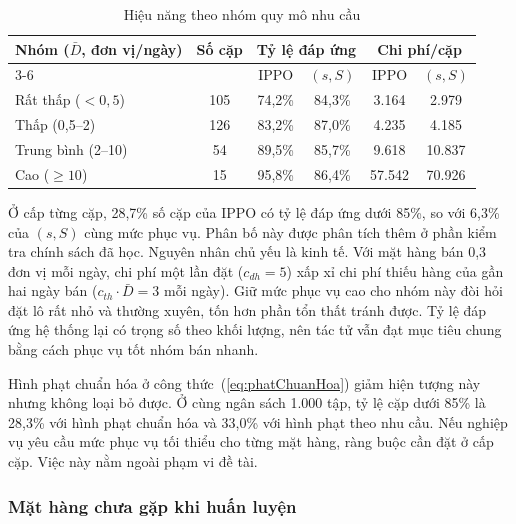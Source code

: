 \begin{table}[H]
    \centering
    \caption{Hiệu năng theo nhóm quy mô nhu cầu}
    \label{tab:theoQuyMo}
    \small
    \begin{tabular}{|l|c|c|c|c|c|}
        \hline
        \multirow{2}{*}{Nhóm ($\bar{D}$, đơn vị/ngày)} &
        \multirow{2}{*}{Số cặp} &
        \multicolumn{2}{c|}{Tỷ lệ đáp ứng} &
        \multicolumn{2}{c|}{Chi phí/cặp} \\
        \cline{3-6}
        & & IPPO & $(s,S)$ & IPPO & $(s,S)$ \\
        \hline
        Rất thấp ($< 0{,}5$)     & 105 & 74,2\% & 84,3\% & 3.164 & 2.979 \\ \hline
        Thấp (0,5--2)      & 126 & 83,2\% & 87,0\% & 4.235 & 4.185 \\ \hline
        Trung bình (2--10)   & 54  & 89,5\% & 85,7\% & 9.618 & 10.837 \\ \hline
        Cao ($\ge 10$)           & 15  & 95,8\% & 86,4\% & 57.542 & 70.926 \\
        \hline
    \end{tabular}
\end{table}

Ở cấp từng cặp, 28,7\% số cặp của IPPO có tỷ lệ đáp ứng dưới 85\%, so với 6,3\% của $(s, S)$ cùng mức phục vụ. Phân bố này được phân tích thêm ở phần kiểm tra chính sách đã học. Nguyên nhân chủ yếu là kinh tế. Với mặt hàng bán 0,3 đơn vị mỗi ngày, chi phí một lần đặt ($c_{dh} = 5$) xấp xỉ chi phí thiếu hàng của gần hai ngày bán ($c_{th} \cdot \bar{D} = 3$ mỗi ngày). Giữ mức phục vụ cao cho nhóm này đòi hỏi đặt lô rất nhỏ và thường xuyên, tốn hơn phần tổn thất tránh được. Tỷ lệ đáp ứng hệ thống lại có trọng số theo khối lượng, nên tác tử vẫn đạt mục tiêu chung bằng cách phục vụ tốt nhóm bán nhanh.

Hình phạt chuẩn hóa ở công thức~(\ref{eq:phatChuanHoa}) giảm hiện tượng này nhưng không loại bỏ được. Ở cùng ngân sách 1.000 tập, tỷ lệ cặp dưới 85\% là 28,3\% với hình phạt chuẩn hóa và 33,0\% với hình phạt theo nhu cầu. Nếu nghiệp vụ yêu cầu mức phục vụ tối thiểu cho từng mặt hàng, ràng buộc cần đặt ở cấp cặp. Việc này nằm ngoài phạm vi đề tài.

\subsubsection{Mặt hàng chưa gặp khi huấn luyện}

